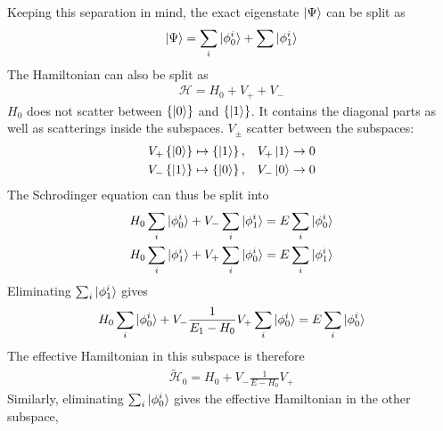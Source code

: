 Keeping this separation in mind, the exact eigenstate \(\ket{\Psi}\) can be split as 
\begin{equation}\begin{aligned}
\ket{\Psi} = \sum_i \ket{\phi_0^i} + \sum \ket{\phi_1^i}
\end{aligned}\end{equation}
The Hamiltonian can also be split as 
\begin{equation}\begin{aligned}
\mathcal{H} = H_0 + V_+ + V_-
\end{aligned}\end{equation}
\(H_0\) does not scatter between \(\left\{\ket{0}\right\}\) and \(\left\{\ket{1}\right\}\). It contains the diagonal parts as well as scatterings inside the subspaces. \(V_\pm\) scatter between the subspaces:
\begin{equation}\begin{aligned}
V_+ \left\{\ket{0}\right\} \mapsto \left\{\ket{1}\right\},&& V_+ \ket{1} \to 0\\
V_- \left\{\ket{1}\right\} \mapsto \left\{\ket{0}\right\},&& V_- \ket{0} \to 0
\end{aligned}\end{equation}
The Schrodinger equation can thus be split into
\begin{equation}\begin{aligned}
H_0 \sum_i \ket{\phi^i_0} + V_-\sum_i \ket{\phi^i_1} &= E \sum_i \ket{\phi^i_0}\\
H_0 \sum_i \ket{\phi^i_1} + V_+\sum_i \ket{\phi^i_0} &= E \sum_i \ket{\phi^i_1}\\
\end{aligned}\end{equation}
Eliminating \(\sum_i \ket{\phi^i_1}\) gives
\begin{equation}\begin{aligned}
H_0 \sum_i \ket{\phi^i_0} + V_-\frac{1}{E_1 - H_0}V_+\sum_i \ket{\phi^i_0} &= E \sum_i \ket{\phi^i_0}\\
\end{aligned}\end{equation}
The effective Hamiltonian in this subspace is therefore
\begin{equation}\begin{aligned}
	\tilde{\mathcal{H}}_0 = H_0 + V_-\frac{1}{E - H_0}V_+
\end{aligned}\end{equation}
Similarly, eliminating \(\sum_i \ket{\phi^i_0}\) gives the effective Hamiltonian in the other subspace,
